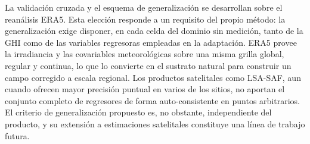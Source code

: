 La validación cruzada y el esquema de generalización se desarrollan sobre el reanálisis ERA5. Esta elección responde a un requisito del propio método: la generalización exige disponer, en cada celda del dominio sin medición, tanto de la GHI como de las variables regresoras empleadas en la adaptación. ERA5 provee la irradiancia y las covariables meteorológicas sobre una misma grilla global, regular y continua, lo que lo convierte en el sustrato natural para construir un campo corregido a escala regional. Los productos satelitales como LSA-SAF, aun cuando ofrecen mayor precisión puntual en varios de los sitios, no aportan el conjunto completo de regresores de forma auto-consistente en puntos arbitrarios. El criterio de generalización propuesto es, no obstante, independiente del producto, y su extensión a estimaciones satelitales constituye una línea de trabajo futura.
